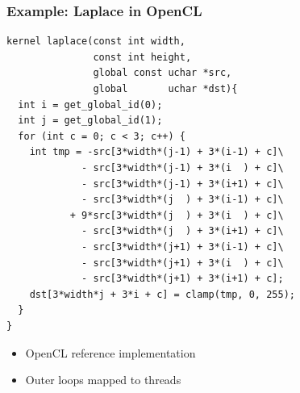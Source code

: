 \documentclass{beamer}
\begin{document}
\begin{frame}[fragile]
  \frametitle{Example: Laplace in OpenCL}
\tiny
\lstset{style=CL}
\begin{lstlisting}
kernel laplace(const int width,
               const int height,
               global const uchar *src,
               global       uchar *dst){
  int i = get_global_id(0);
  int j = get_global_id(1);
  for (int c = 0; c < 3; c++) {
    int tmp = -src[3*width*(j-1) + 3*(i-1) + c]\
             - src[3*width*(j-1) + 3*(i  ) + c]\
             - src[3*width*(j-1) + 3*(i+1) + c]\
             - src[3*width*(j  ) + 3*(i-1) + c]\
           + 9*src[3*width*(j  ) + 3*(i  ) + c]\
             - src[3*width*(j  ) + 3*(i+1) + c]\
             - src[3*width*(j+1) + 3*(i-1) + c]\
             - src[3*width*(j+1) + 3*(i  ) + c]\
             - src[3*width*(j+1) + 3*(i+1) + c];
    dst[3*width*j + 3*i + c] = clamp(tmp, 0, 255);
  }
}
\end{lstlisting}
\begin{itemize}
\item OpenCL reference implementation
\item Outer loops mapped to threads
\end{itemize}
\end{frame}
\end{document}
